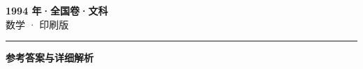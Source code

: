 \documentclass[zihao=5, a4paper]{ctexart}
\begin{document}
\begin{center}
  {\Large\bfseries 1994 年·全国卷·文科}\\[4pt]
  {\large 数学 · 印刷版}
\end{center}
\medskip
{}

\par\bigskip\hrule\bigskip
{}
\begin{center}{\large\bfseries 参考答案与详细解析}\end{center}
\smallskip

\end{document}
